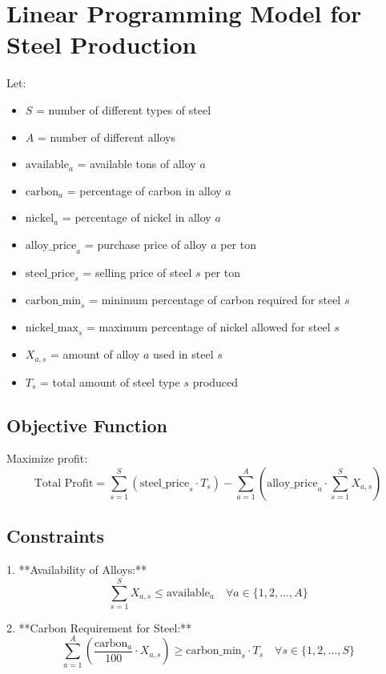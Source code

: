 \documentclass{article}
\begin{document}
\section*{Linear Programming Model for Steel Production}

Let:
\begin{itemize}
    \item \( S \) = number of different types of steel
    \item \( A \) = number of different alloys
    \item \( \text{available}_{a} \) = available tons of alloy \( a \)
    \item \( \text{carbon}_{a} \) = percentage of carbon in alloy \( a \)
    \item \( \text{nickel}_{a} \) = percentage of nickel in alloy \( a \)
    \item \( \text{alloy\_price}_{a} \) = purchase price of alloy \( a \) per ton
    \item \( \text{steel\_price}_{s} \) = selling price of steel \( s \) per ton
    \item \( \text{carbon\_min}_{s} \) = minimum percentage of carbon required for steel \( s \)
    \item \( \text{nickel\_max}_{s} \) = maximum percentage of nickel allowed for steel \( s \)
    \item \( X_{a,s} \) = amount of alloy \( a \) used in steel \( s \)
    \item \( T_{s} \) = total amount of steel type \( s \) produced
\end{itemize}

\subsection*{Objective Function}
Maximize profit:
\[
\text{Total Profit} = \sum_{s=1}^{S} (\text{steel\_price}_{s} \cdot T_{s}) - \sum_{a=1}^{A} (\text{alloy\_price}_{a} \cdot \sum_{s=1}^{S} X_{a,s})
\]

\subsection*{Constraints}

1. **Availability of Alloys:**
\[
\sum_{s=1}^{S} X_{a,s} \leq \text{available}_{a} \quad \forall a \in \{1, 2, \ldots, A\}
\]

2. **Carbon Requirement for Steel:**
\[
\sum_{a=1}^{A} \left( \frac{\text{carbon}_{a}}{100} \cdot X_{a,s} \right) \geq \text{carbon\_min}_{s} \cdot T_{s} \quad \forall s \in \{1, 2, \ldots, S\}
\]
\end{document}
